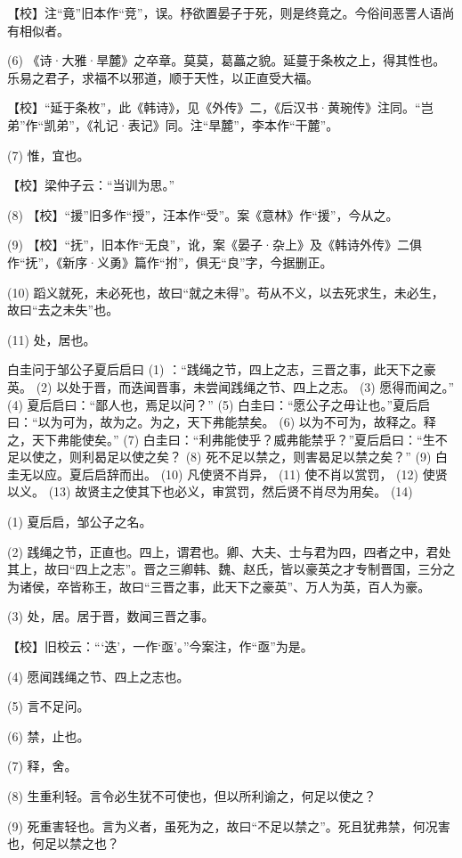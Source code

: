 \documentclass[12pt,UTF8]{ctexbook}
\begin{document}
【校】注“竟”旧本作“竞”，误。杼欲置晏子于死，则是终竟之。今俗间恶詈人语尚有相似者。

(6) 《诗·大雅·旱麓》之卒章。莫莫，葛藟之貌。延蔓于条枚之上，得其性也。乐易之君子，求福不以邪道，顺于天性，以正直受大福。

【校】“延于条枚”，此《韩诗》，见《外传》二，《后汉书·黄琬传》注同。“岂弟”作“凯弟”，《礼记·表记》同。注“旱麓”，李本作“干麓”。

(7) 惟，宜也。

【校】梁仲子云：“当训为思。”

(8) 【校】“援”旧多作“授”，汪本作“受”。案《意林》作“援”，今从之。

(9) 【校】“抚”，旧本作“无良”，讹，案《晏子·杂上》及《韩诗外传》二俱作“抚”，《新序·义勇》篇作“拊”，俱无“良”字，今据删正。

(10) 蹈义就死，未必死也，故曰“就之未得”。苟从不义，以去死求生，未必生，故曰“去之未失”也。

(11) 处，居也。

白圭问于邹公子夏后启曰 (1) ：“践绳之节，四上之志，三晋之事，此天下之豪英。 (2) 以处于晋，而迭闻晋事，未尝闻践绳之节、四上之志。 (3) 愿得而闻之。” (4) 夏后启曰：“鄙人也，焉足以问？” (5) 白圭曰：“愿公子之毋让也。”夏后启曰：“以为可为，故为之。为之，天下弗能禁矣。 (6) 以为不可为，故释之。释之，天下弗能使矣。” (7) 白圭曰：“利弗能使乎？威弗能禁乎？”夏后启曰：“生不足以使之，则利曷足以使之矣？ (8) 死不足以禁之，则害曷足以禁之矣？” (9) 白圭无以应。夏后启辞而出。 (10) 凡使贤不肖异， (11) 使不肖以赏罚， (12) 使贤以义。 (13) 故贤主之使其下也必义，审赏罚，然后贤不肖尽为用矣。 (14)

(1) 夏后启，邹公子之名。

(2) 践绳之节，正直也。四上，谓君也。卿、大夫、士与君为四，四者之中，君处其上，故曰“四上之志”。晋之三卿韩、魏、赵氏，皆以豪英之才专制晋国，三分之为诸侯，卒皆称王，故曰“三晋之事，此天下之豪英”、万人为英，百人为豪。

(3) 处，居。居于晋，数闻三晋之事。

【校】旧校云：“‘迭’，一作‘亟’。”今案注，作“亟”为是。

(4) 愿闻践绳之节、四上之志也。

(5) 言不足问。

(6) 禁，止也。

(7) 释，舍。

(8) 生重利轻。言令必生犹不可使也，但以所利谕之，何足以使之？

(9) 死重害轻也。言为义者，虽死为之，故曰“不足以禁之”。死且犹弗禁，何况害也，何足以禁之也？
\end{document}
